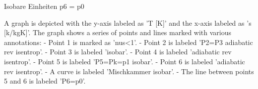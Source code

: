 Isobare Einheiten p6 = p0

A graph is depicted with the y-axis labeled as 'T [K]' and the x-axis labeled as 's [k/kgK]'. The graph shows a series of points and lines marked with various annotations:
- Point 1 is marked as 'nus<1'.
- Point 2 is labeled 'P2=P3 adiabatic rev isentrop'.
- Point 3 is labeled 'isobar'.
- Point 4 is labeled 'adiabatic rev isentrop'.
- Point 5 is labeled 'P5=Pk=p1 isobar'.
- Point 6 is labeled 'adiabatic rev isentrop'.
- A curve is labeled 'Mischkammer isobar'.
- The line between points 5 and 6 is labeled 'P6=p0'.
